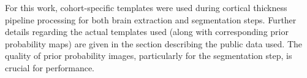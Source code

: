 
For this work, cohort-specific templates were used during cortical thickness pipeline
processing for both brain extraction and segmentation steps.  Further details regarding
the actual templates used (along with corresponding prior probability maps) are given 
in the section describing the public data used.  The quality of prior probability images,
particularly for the segmentation step, is crucial for performance.  

